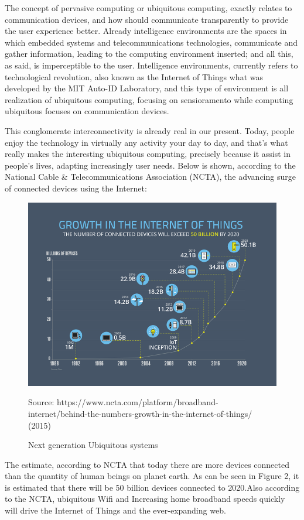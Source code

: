 \documentclass[a4paper,times,12pt]{article}
\begin{document}
\par The concept of pervasive computing or ubiquitous computing, exactly relates to communication devices, and how should communicate transparently to provide the user experience better. Already intelligence environments are the spaces in which embedded systems and telecommunications technologies, communicate and gather information, leading to the computing environment inserted; and all this, as said, is imperceptible to the user. Intelligence environments, currently refers to technological revolution, also known as the Internet of Things what was developed by the MIT Auto-ID Laboratory, and this type of environment is all realization of ubiquitous computing, focusing on sensioramento while computing ubiquitous focuses on communication devices.
\par This conglomerate interconnectivity is already real in our present. Today, people enjoy the technology in virtually any activity your day to day, and that's what really makes the interesting ubiquitous computing, precisely because it assist in people's lives, adapting increasingly user needs. Below is shown, according to the National Cable \& Telecommunications Association (NCTA), the advancing surge of connected devices using the Internet:
\begin{figure}[!ht]
  \centering
  \includegraphics[width=1\textwidth]{assets/images/img2}
  \caption{Next generation Ubiquitous systems}{Source: https://www.ncta.com/platform/broadband-internet/behind-the-numbers-growth-in-the-internet-of-things/ (2015)} \end{figure}
\par The estimate, according to NCTA that today there are more devices connected than the quantity of human beings on planet earth. As can be seen in Figure 2, it is estimated that there will be 50 billion devices connected to 2020.Also according to the NCTA, ubiquitous Wifi and Increasing home broadband speeds quickly will drive the Internet of Things and the ever-expanding web.
\end{document}
